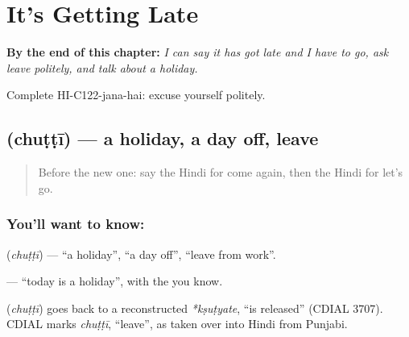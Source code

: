 
\chapter{It's Getting Late}
\label{ch:hi-getting-late}

\begin{chapteropening}
\textbf{By the end of this chapter:} \emph{I can say it has got late and I have to go, ask leave politely, and talk about a holiday.}

Complete HI-C122-jana-hai: excuse yourself politely.
\end{chapteropening}

\section[\texorpdfstring{\hi{छुट्टी} (chuṭṭī)}{छुट्टी (chuṭṭī)}]{ (chuṭṭī) — a holiday, a day off, leave}

\label{lesson:HI-C122-chhutti}



\begin{quote}
Before the new one: say the Hindi for come again, then the Hindi for let's go.
\end{quote}

\subsection*{You'll want to know: }
\textbf{} (\emph{chuṭṭī}) — \textquotedblleft{}a holiday\textquotedblright{}, \textquotedblleft{}a day off\textquotedblright{}, \textquotedblleft{}leave from work\textquotedblright{}.

\textbf{  } — \textquotedblleft{}today is a holiday\textquotedblright{}, with the \textbf{} you know.

\begin{cousinweb}
\textbf{} (\emph{chuṭṭī}) goes back to a reconstructed \emph{*kṣuṭyate}, \textquotedblleft{}is released\textquotedblright{} (CDIAL 3707). CDIAL marks \emph{chuṭṭī}, \textquotedblleft{}leave\textquotedblright{}, as taken over into Hindi from Punjabi.
\end{cousinweb}

